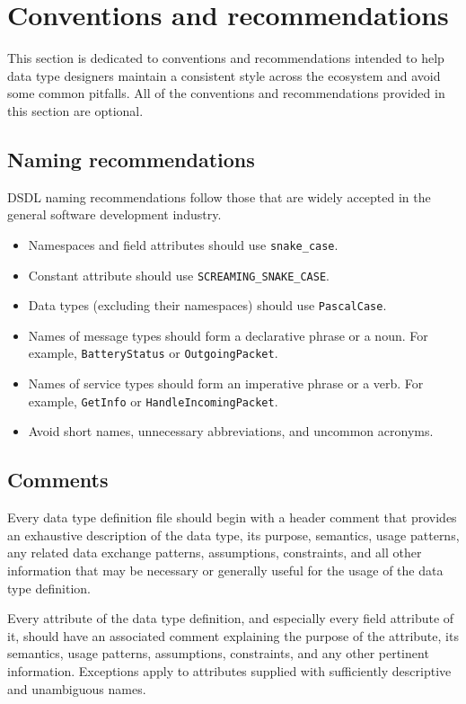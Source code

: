 \section{Conventions and recommendations}

This section is dedicated to conventions and recommendations
intended to help data type designers maintain a consistent style across the ecosystem
and avoid some common pitfalls.
All of the conventions and recommendations provided in this section are optional.

\subsection{Naming recommendations}

DSDL naming recommendations follow those that are widely accepted in the general software development industry.

\begin{itemize}
    \item Namespaces and field attributes should use \verb|snake_case|.
    \item Constant attribute should use \verb|SCREAMING_SNAKE_CASE|.
    \item Data types (excluding their namespaces) should use \verb|PascalCase|.
    \item Names of message types should form a declarative phrase or a noun. For example,
    \verb|BatteryStatus| or \verb|OutgoingPacket|.
    \item Names of service types should form an imperative phrase or a verb. For example,
    \verb|GetInfo| or \verb|HandleIncomingPacket|.
    \item Avoid short names, unnecessary abbreviations, and uncommon acronyms.
\end{itemize}

\subsection{Comments}

Every data type definition file should begin with a header comment that provides an exhaustive description
of the data type, its purpose, semantics, usage patterns, any related data exchange patterns,
assumptions, constraints, and all other information that may be necessary or generally useful for the usage of the
data type definition.

Every attribute of the data type definition, and especially every field attribute of it,
should have an associated comment explaining the purpose of the attribute, its semantics, usage patterns,
assumptions, constraints, and any other pertinent information.
Exceptions apply to attributes supplied with sufficiently descriptive and unambiguous names.

